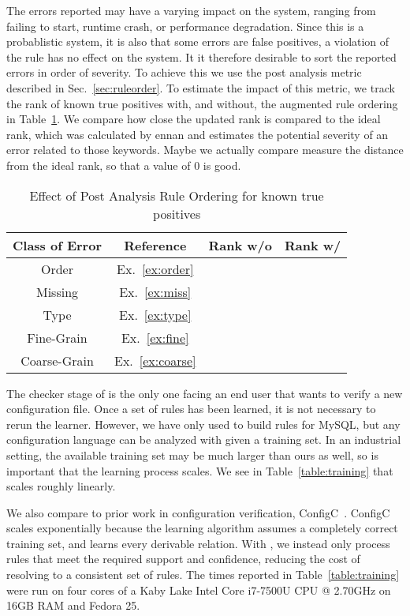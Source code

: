 The errors reported may have a varying impact on the system, ranging from failing to start, runtime crash, or performance degradation.
Since this is a probablistic system, it is also that some errors are false positives, a violation of the rule has no effect on the system.
It it therefore desirable to sort the reported errors in order of severity. 
To achieve this we use the post analysis metric described in Sec.~\ref{sec:ruleorder}.
To estimate the impact of this metric, we track the rank of known true positives with, and without, the augmented rule ordering in Table~\ref{table:order}.
We compare how close the updated rank is compared to the ideal rank, which was calculated by ennan and estimates the potential severity of an error related to those keywords.
Maybe we actually compare measure the distance from the ideal rank, so that a value of 0 is good.

\begin{table}[h]
\centering
\caption{Effect of Post Analysis Rule Ordering for known true positives}
\label{table:order}
\setlength{\tabcolsep}{1em}
\begin{tabular}{|c|c|c|c|}
\hline
{\bf Class of Error} & {\bf Reference} & {\bf Rank w/o} & {\bf Rank w/}\\
\hline
\hline
Order        & Ex.~\ref{ex:order}   &  & \\ 
Missing      & Ex.~\ref{ex:miss}    &  & \\ 
Type         & Ex.~\ref{ex:type}    &  & \\ 
Fine-Grain   & Ex.~\ref{ex:fine}    &  & \\ 
Coarse-Grain & Ex.~\ref{ex:coarse}  &  & \\ 
\hline
\end{tabular}
\end{table}

The checker stage of \app is the only one facing an end user that wants to verify a new configuration file.
Once a set of rules has been learned, it is not necessary to rerun the learner.
However, we have only used \app to build rules for MySQL, but any configuration language can be analyzed with \app given a training set.
In an industrial setting, the available training set may be much larger than ours as well, so is important that the learning process scales.
We see in Table~\ref{table:training} that \app scales roughly linearly.

We also compare \app to prior work in configuration verification, ConfigC~\cite{santolucitoCAV}.
ConfigC scales exponentially because the learning algorithm assumes a completely correct training set, and learns every derivable relation.
With \app, we instead only process rules that meet the required support and confidence, reducing the cost of resolving to a consistent set of rules. 
The times reported in Table~\ref{table:training} were run on four cores of a Kaby Lake Intel Core i7-7500U CPU @ 2.70GHz on 16GB RAM and Fedora 25.

